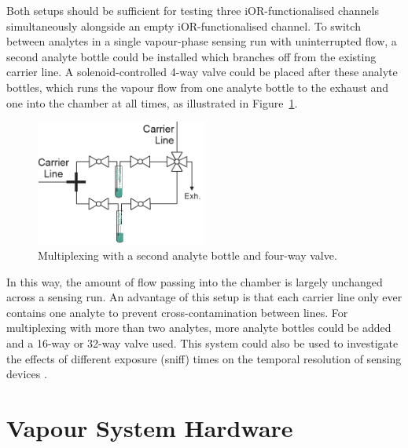 \documentclass[
  a4paper,
]{scrbook}
\begin{document}
Both setups should be sufficient for testing three iOR-functionalised
channels simultaneously alongside an empty iOR-functionalised channel.
To switch between analytes in a single vapour-phase sensing run with
uninterrupted flow, a second analyte bottle could be installed which
branches off from the existing carrier line. A solenoid-controlled 4-way
valve could be placed after these analyte bottles, which runs the vapour
flow from one analyte bottle to the exhaust and one into the chamber at
all times, as illustrated in
Figure~\ref{fig-vapour-sensor-multiplexing}.

\begin{figure}

{\centering \includegraphics[width=0.5\textwidth,height=\textheight]{figures/ch10/multiplex-vapoursensor.png}

}

\caption[Multiplexing with a second analyte bottle and four-way
valve.]{\label{fig-vapour-sensor-multiplexing}Multiplexing with a second
analyte bottle and four-way valve.}

\end{figure}

In this way, the amount of flow passing into the chamber is largely
unchanged across a sensing run. An advantage of this setup is that each
carrier line only ever contains one analyte to prevent
cross-contamination between lines. For multiplexing with more than two
analytes, more analyte bottles could be added and a 16-way or 32-way
valve used. This system could also be used to investigate the effects of
different exposure (sniff) times on the temporal resolution of sensing
devices \autocite{Spencer2021,Wu2024}.

\cleardoublepage
{}
{}
\appendix

\hypertarget{vapour-system-hardware}{%
\chapter{Vapour System Hardware}\label{vapour-system-hardware}}
\end{document}
